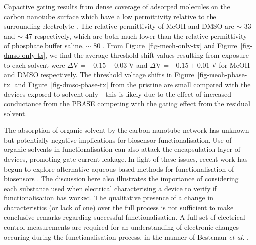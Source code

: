 \documentclass[
  a4paper,
]{scrbook}
\begin{document}
Capactive gating results from dense coverage of adsorped molecules on
the carbon nanotube surface which have a low permittivity relative to
the surrounding electrolyte \autocite{Heller2008}. The relative
permittivity of MeOH and DMSO are \(\sim\) 33 \autocite{Mohsen-Nia2010}
and \(\sim\) 47 \autocite{Hunger2010} respectively, which are both much
lower than the relative permittivity of phosphate buffer saline,
\(\sim\) 80 \autocite{Shkodra2021}. From Figure~\ref{fig-meoh-only-tx}
and Figure~\ref{fig-dmso-only-tx}, we find the average threshold shift
values resulting from exposure to each solvent were \(\Delta\)V =
\(-0.15 \pm 0.03\) V and \(\Delta\)V = \(-0.15 \pm 0.01\) V for MeOH and
DMSO respectively. The threshold voltage shifts in
Figure~\ref{fig-meoh-pbase-tx} and Figure~\ref{fig-dmso-pbase-tx} from
the pristine are small compared with the devices exposed to solvent only
- this is likely due to the effect of increased conductance from the
PBASE competing with the gating effect from the residual solvent.

The absorption of organic solvent by the carbon nanotube network has
unknown but potentially negative implications for biosensor
functionalisation. Use of organic solvents in functionalisation can also
attack the encapsulation layer of devices, promoting gate current
leakage. In light of these issues, recent work has begun to explore
alternative aqueous-based methods for functionalisation of biosensors
\autocite{Khan2021}. The discussion here also illustrates the importance
of considering each substance used when electrical characterising a
device to verify if functionalisation has worked. The qualitative
presence of a change in characteristics (or lack of one) over the full
process is not sufficient to make conclusive remarks regarding
successful functionalisation. A full set of electrical control
measurements are required for an understanding of electronic changes
occuring during the functionalisation process, in the manner of Besteman
\emph{et al.} \autocite{Besteman2003}.

\newpage
{}

\hfill\break
\hfill\break
\end{document}
